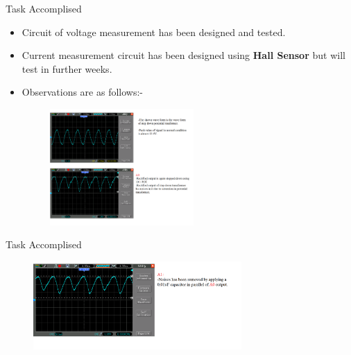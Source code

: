 \documentclass[10pt, a4paper]{beamer}
\begin{document}
\begin{frame}{Task Accomplised}
	\begin{itemize}
		\item Circuit of voltage measurement has been designed and tested. 
		\item Current measurement circuit has been designed using \textbf{Hall Sensor} but will test in further weeks.
		\item Observations are as follows:-
		\vspace{0.3cm}
		\begin{figure}[h]
			\includegraphics[width=207px]{voltage_circuit}
		\end{figure}
	\end{itemize}
\end{frame}
\begin{frame}{Task Accomplised}
		\begin{figure}[h]
			\includegraphics[width=300px]{voltage1}
		\end{figure}
\end{frame}
\end{document}
